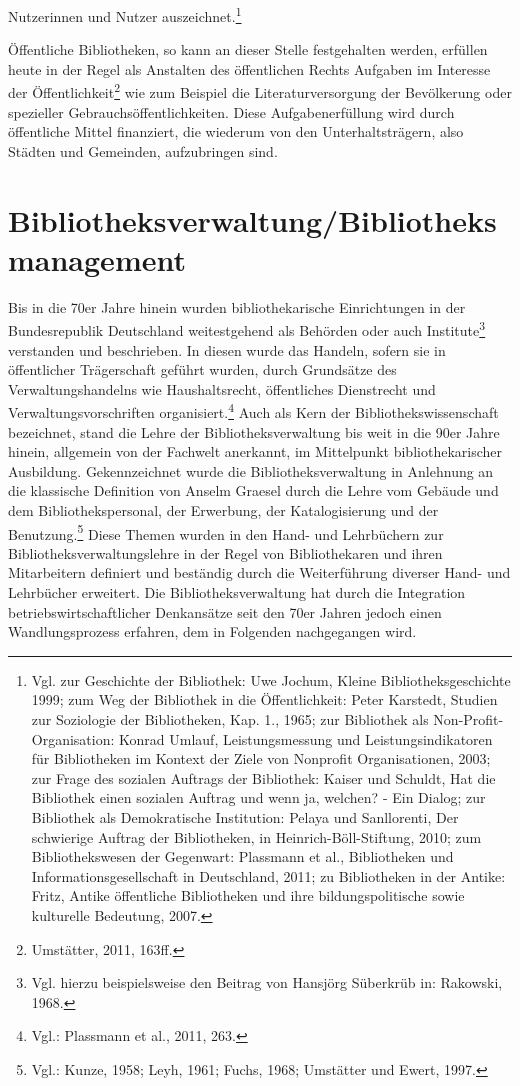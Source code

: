 \documentclass[a4paper,
fontsize=11pt,
oneside,
numbers=noperiodatend,
parskip=half-,
bibliography=totoc,
final
]{scrartcl}
\begin{document}
Nutzerinnen und Nutzer auszeichnet.\footnote{Vgl. zur Geschichte der
  Bibliothek: Uwe Jochum, Kleine Bibliotheksgeschichte 1999; zum Weg der
  Bibliothek in die Öffentlichkeit: Peter Karstedt, Studien zur
  Soziologie der Bibliotheken, Kap. 1., 1965; zur Bibliothek als
  Non-Profit-Organisation: Konrad Umlauf, Leistungsmessung und
  Leistungsindikatoren für Bibliotheken im Kontext der Ziele von
  Nonprofit Organisationen, 2003; zur Frage des sozialen Auftrags der
  Bibliothek: Kaiser und Schuldt, Hat die Bibliothek einen sozialen
  Auftrag und wenn ja, welchen? - Ein Dialog; zur Bibliothek als
  Demokratische Institution: Pelaya und Sanllorenti, Der schwierige
  Auftrag der Bibliotheken, in Heinrich-Böll-Stiftung, 2010; zum
  Bibliothekswesen der Gegenwart: Plassmann et al., Bibliotheken und
  Informationsgesellschaft in Deutschland, 2011; zu Bibliotheken in der
  Antike: Fritz, Antike öffentliche Bibliotheken und ihre
  bildungspolitische sowie kulturelle Bedeutung, 2007.}

Öffentliche Bibliotheken, so kann an dieser Stelle festgehalten werden,
erfüllen heute in der Regel als Anstalten des öffentlichen Rechts
Aufgaben im Interesse der Öffentlichkeit\footnote{Umstätter, 2011,
  163ff.} wie zum Beispiel die Literaturversorgung der Bevölkerung oder
spezieller Gebrauchsöffentlichkeiten. Diese Aufgabenerfüllung wird durch
öffentliche Mittel finanziert, die wiederum von den Unterhaltsträgern,
also Städten und Gemeinden, aufzubringen sind.

\section*{Bibliotheksverwaltung/Bibliotheksmanagement}\label{bibliotheksverwaltungbibliotheksmanagement}

Bis in die 70er Jahre hinein wurden bibliothekarische Einrichtungen in
der Bundesrepublik Deutschland weitestgehend als Behörden oder auch
Institute\footnote{Vgl. hierzu beispielsweise den Beitrag von Hansjörg
  Süberkrüb in: Rakowski, 1968.} verstanden und beschrieben. In diesen
wurde das Handeln, sofern sie in öffentlicher Trägerschaft geführt
wurden, durch Grundsätze des Verwaltungshandelns wie Haushaltsrecht,
öffentliches Dienstrecht und Verwaltungsvorschriften
organisiert.\footnote{Vgl.: Plassmann et al., 2011, 263.} Auch als Kern
der Bibliothekswissenschaft bezeichnet, stand die Lehre der
Bibliotheksverwaltung bis weit in die 90er Jahre hinein, allgemein von
der Fachwelt anerkannt, im Mittelpunkt bibliothekarischer Ausbildung.
Gekennzeichnet wurde die Bibliotheksverwaltung in Anlehnung an die
klassische Definition von Anselm Graesel durch die Lehre vom Gebäude und
dem Bibliothekspersonal, der Erwerbung, der Katalogisierung und der
Benutzung.\footnote{Vgl.: Kunze, 1958; Leyh, 1961; Fuchs, 1968;
  Umstätter und Ewert, 1997.} Diese Themen wurden in den Hand- und
Lehrbüchern zur Bibliotheksverwaltungslehre in der Regel von
Bibliothekaren und ihren Mitarbeitern definiert und beständig durch die
Weiterführung diverser Hand- und Lehrbücher erweitert. Die
Bibliotheksverwaltung hat durch die Integration betriebswirtschaftlicher
Denkansätze seit den 70er Jahren jedoch einen Wandlungsprozess erfahren,
dem in Folgenden nachgegangen wird.
\end{document}
